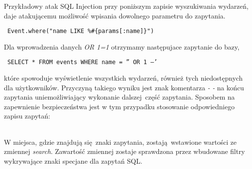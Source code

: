 Przykładowy atak SQL Injection przy poniższym zapisie wyszukiwania wydarzeń, daje atakującemu możliwość wpisania dowolnego parametru do zapytania.

\begin{center}
  \texttt{ Event.where("name LIKE \%\#\{params[:name]\}") }
\end{center}

Dla wprowadzenia danych \emph{OR 1=1} otrzymamy następujace zapytanie do bazy,

\begin{center}
  \texttt{ SELECT * FROM events WHERE name = '' OR 1 --' }
\end{center}

które spowoduje wyświetlenie wszystkich wydarzeń, również tych niedostępnych dla użytkowników. Przyczyną takiego wyniku jest znak komentarza \emph{- -} na końcu zapytania uniemożliwiający wykonanie dalszej część zapytania.
Sposobem na zapewnienie bezpieczeństwa jest w tym przypadku stosowanie odpowiedniego zapisu zapytań:

\begin{code}
  
\end{code}\\

W miejsca, gdzie znajdują się znaki zapytania, zostają wstawione wartości ze zmiennej \emph{search}. Zawartość zmiennej zostaje sprawdzona przez wbudowane filtry wykrywające znaki specjane dla zapytań SQL.
